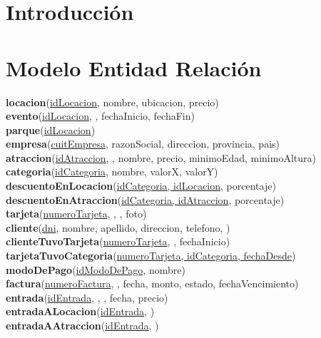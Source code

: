\documentclass[10pt,a4paper]{article}
\begin{document}


\maketitle

\newpage

\tableofcontents

\newpage

\section{Introducción}

\newpage

\section{Modelo Entidad Relación}

\textbf{locacion}(\underline{idLocacion}, nombre, ubicacion, precio) \\
\textbf{evento}(\underline{idLocacion}, , fechaInicio, fechaFin) \\
\textbf{parque}(\underline{idLocacion}) \\
\textbf{empresa}(\underline{cuitEmpresa}, razonSocial, direccion, provincia, pais) \\
\textbf{atraccion}(\underline{idAtraccion}, , nombre, precio, minimoEdad, minimoAltura) \\
\textbf{categoria}(\underline{idCategoria}, nombre, valorX, valorY) \\
\textbf{descuentoEnLocacion}(\underline{idCategoria, idLocacion}, porcentaje) \\
\textbf{descuentoEnAtraccion}(\underline{idCategoria, idAtraccion}, porcentaje) \\
\textbf{tarjeta}(\underline{numeroTarjeta}, , , foto) \\
\textbf{cliente}(\underline{dni}, nombre, apellido, direccion, telefono, ) \\
\textbf{clienteTuvoTarjeta}(\underline{numeroTarjeta}, , fechaInicio) \\
\textbf{tarjetaTuvoCategoria}(\underline{numeroTarjeta, idCategoria, fechaDesde}) \\
\textbf{modoDePago}(\underline{idModoDePago}, nombre) \\
\textbf{factura}(\underline{numeroFactura}, , fecha, monto, estado, fechaVencimiento) \\
\textbf{entrada}(\underline{idEntrada}, , , fecha, precio) \\
\textbf{entradaALocacion}(\underline{idEntrada}, ) \\
\textbf{entradaAAtraccion}(\underline{idEntrada}, ) \\
\end{document}
